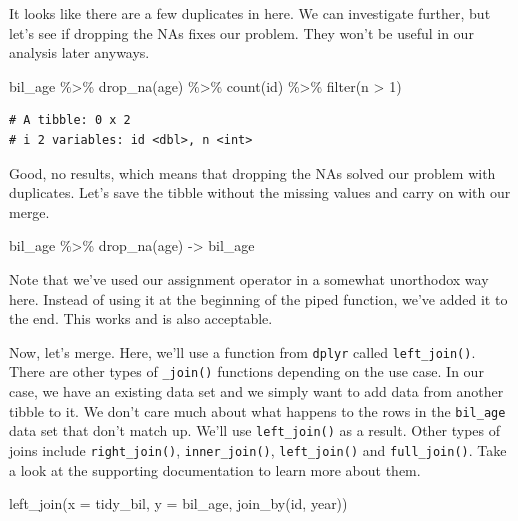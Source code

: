 \documentclass[
  letterpaper,
]{book}
\newenvironment{Shaded}{\begin{snugshade}}{\end{snugshade}}
\newcommand{\AttributeTok}[1]{\textcolor[rgb]{0.40,0.45,0.13}{#1}}
\newcommand{\DecValTok}[1]{\textcolor[rgb]{0.68,0.00,0.00}{#1}}
\newcommand{\FunctionTok}[1]{\textcolor[rgb]{0.28,0.35,0.67}{#1}}
\newcommand{\NormalTok}[1]{\textcolor[rgb]{0.00,0.23,0.31}{#1}}
\newcommand{\OtherTok}[1]{\textcolor[rgb]{0.00,0.23,0.31}{#1}}
\newcommand{\SpecialCharTok}[1]{\textcolor[rgb]{0.37,0.37,0.37}{#1}}
\begin{document}
It looks like there are a few duplicates in here. We can investigate
further, but let's see if dropping the NAs fixes our problem. They won't
be useful in our analysis later anyways.

\begin{Shaded}
\begin{Highlighting}[]
\NormalTok{bil\_age }\SpecialCharTok{\%\textgreater{}\%}
  \FunctionTok{drop\_na}\NormalTok{(age) }\SpecialCharTok{\%\textgreater{}\%}
  \FunctionTok{count}\NormalTok{(id) }\SpecialCharTok{\%\textgreater{}\%}
  \FunctionTok{filter}\NormalTok{(n }\SpecialCharTok{\textgreater{}} \DecValTok{1}\NormalTok{)}
\end{Highlighting}
\end{Shaded}

\begin{verbatim}
# A tibble: 0 x 2
# i 2 variables: id <dbl>, n <int>
\end{verbatim}

Good, no results, which means that dropping the NAs solved our problem
with duplicates. Let's save the tibble without the missing values and
carry on with our merge.

\begin{Shaded}
\begin{Highlighting}[]
\NormalTok{bil\_age }\SpecialCharTok{\%\textgreater{}\%}
  \FunctionTok{drop\_na}\NormalTok{(age) }\OtherTok{{-}\textgreater{}}\NormalTok{ bil\_age}
\end{Highlighting}
\end{Shaded}

Note that we've used our assignment operator in a somewhat unorthodox
way here. Instead of using it at the beginning of the piped function,
we've added it to the end. This works and is also acceptable.

Now, let's merge. Here, we'll use a function from \texttt{dplyr} called
\texttt{left\_join()}. There are other types of \texttt{\_join()}
functions depending on the use case. In our case, we have an existing
data set and we simply want to add data from another tibble to it. We
don't care much about what happens to the rows in the \texttt{bil\_age}
data set that don't match up. We'll use \texttt{left\_join()} as a
result. Other types of joins include \texttt{right\_join()},
\texttt{inner\_join()}, \texttt{left\_join()} and \texttt{full\_join()}.
Take a look at the supporting documentation to learn more about them.

\begin{Shaded}
\begin{Highlighting}[]
\FunctionTok{left\_join}\NormalTok{(}\AttributeTok{x =}\NormalTok{ tidy\_bil, }
          \AttributeTok{y =}\NormalTok{ bil\_age, }
          \FunctionTok{join\_by}\NormalTok{(id, year))}
\end{Highlighting}
\end{Shaded}
\end{document}

